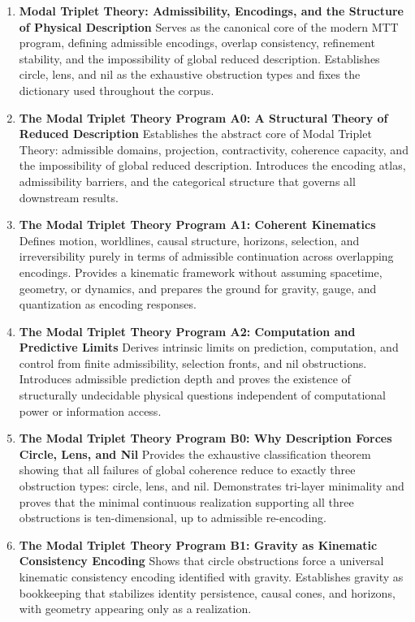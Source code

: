 \documentclass[11pt]{article}
\begin{document}
\begin{enumerate}[leftmargin=*]
\item \textbf{Modal Triplet Theory: Admissibility, Encodings, and the Structure of Physical Description}  
Serves as the canonical core of the modern MTT program, defining admissible encodings, overlap consistency, refinement stability, and the impossibility of global reduced description. Establishes circle, lens, and nil as the exhaustive obstruction types and fixes the dictionary used throughout the corpus.
\item \textbf{The Modal Triplet Theory Program A0: A Structural Theory of Reduced Description}  
Establishes the abstract core of Modal Triplet Theory: admissible domains, projection, contractivity, coherence capacity, and the impossibility of global reduced description. Introduces the encoding atlas, admissibility barriers, and the categorical structure that governs all downstream results.

\item \textbf{The Modal Triplet Theory Program A1: Coherent Kinematics}  
Defines motion, worldlines, causal structure, horizons, selection, and irreversibility purely in terms of admissible continuation across overlapping encodings. Provides a kinematic framework without assuming spacetime, geometry, or dynamics, and prepares the ground for gravity, gauge, and quantization as encoding responses.

\item \textbf{The Modal Triplet Theory Program A2: Computation and Predictive Limits}  
Derives intrinsic limits on prediction, computation, and control from finite admissibility, selection fronts, and nil obstructions. Introduces admissible prediction depth and proves the existence of structurally undecidable physical questions independent of computational power or information access.

\item \textbf{The Modal Triplet Theory Program B0: Why Description Forces Circle, Lens, and Nil}  
Provides the exhaustive classification theorem showing that all failures of global coherence reduce to exactly three obstruction types: circle, lens, and nil. Demonstrates tri-layer minimality and proves that the minimal continuous realization supporting all three obstructions is ten-dimensional, up to admissible re-encoding.

\item \textbf{The Modal Triplet Theory Program B1: Gravity as Kinematic Consistency Encoding}  
Shows that circle obstructions force a universal kinematic consistency encoding identified with gravity. Establishes gravity as bookkeeping that stabilizes identity persistence, causal cones, and horizons, with geometry appearing only as a realization.


\end{enumerate}
\end{document}
